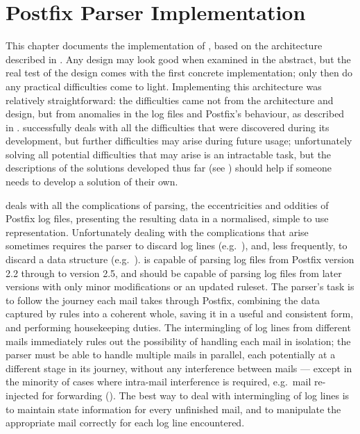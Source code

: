 \chapter{Postfix Parser Implementation}

\label{Postfix Parser Implementation}

This chapter documents the implementation of \parsername{}, based on the
architecture described in .  Any design may
look good when examined in the abstract, but the real test of the design
comes with the first concrete implementation; only then do any practical
difficulties come to light.  Implementing this architecture was relatively
straightforward: the difficulties came not from the architecture and
design, but from anomalies in the log files and Postfix's behaviour, as
described in .  \parsername{} successfully deals
with all the difficulties that were discovered during its development, but
further difficulties may arise during future usage; unfortunately solving
all potential difficulties that may arise is an intractable task, but the
descriptions of the solutions developed thus far (see
) should help if someone needs to develop a
solution of their own.

\parsername{} deals with all the complications of parsing, the
eccentricities and oddities of Postfix log files, presenting the resulting
data in a normalised, simple to use representation.  Unfortunately dealing
with the complications that arise sometimes requires the parser to discard
log lines (e.g.\ ), and, less
frequently, to discard a data structure (e.g.\ ).  \parsername{} is capable of parsing log files from Postfix
version 2.2 through to version 2.5, and should be capable of parsing log
files from later versions with only minor modifications or an updated
ruleset.  The parser's task is to follow the journey each mail takes
through Postfix, combining the data captured by rules into a coherent
whole, saving it in a useful and consistent form, and performing
housekeeping duties.  The intermingling of log lines from different mails
immediately rules out the possibility of handling each mail in isolation;
the parser must be able to handle multiple mails in parallel, each
potentially at a different stage in its journey, without any interference
between mails --- except in the minority of cases where intra-mail
interference is required, e.g.\ mail re-injected for forwarding
().  The best way to deal with intermingling
of log lines is to maintain state information for every unfinished mail,
and to manipulate the appropriate mail correctly for each log line
encountered.

